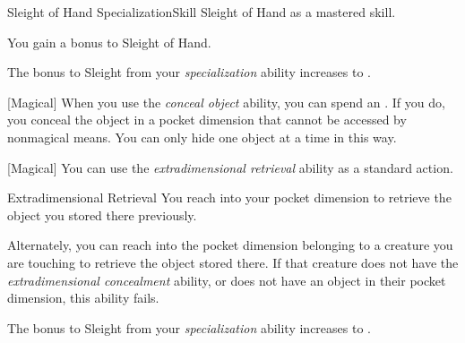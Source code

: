     \begin{feat}{Sleight of Hand Specialization}{Skill}
        \featpre Sleight of Hand as a mastered skill.

         You gain a  bonus to Sleight of Hand.

        \ff[2]{}

         The bonus to Sleight from your \textit{specialization} ability increases to .

        [Magical] When you use the \textit{conceal object} ability, you can spend an .
        If you do, you conceal the object in a pocket dimension that cannot be accessed by nonmagical means.
        You can only hide one object at a time in this way.

        [Magical] You can use the \textit{extradimensional retrieval} ability as a standard action.
        \begin{apability}{Extradimensional Retrieval}
            You reach into your pocket dimension to retrieve the object you stored there previously.

            Alternately, you can reach into the pocket dimension belonging to a creature you are touching to retrieve the object stored there.
            If that creature does not have the \textit{extradimensional concealment} ability, or does not have an object in their pocket dimension, this ability fails.
        \end{apability}

         The bonus to Sleight from your \textit{specialization} ability increases to .
    \end{feat}


